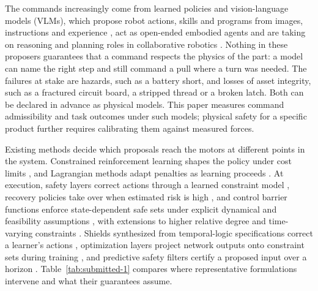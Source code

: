\documentclass[12pt]{article}
\begin{document}
The commands increasingly come from learned policies and vision-language
models (VLMs), which propose robot actions, skills and programs from images,
instructions and experience \cite{ref8,ref9,ref10,ref11,ref13}, act as open-ended
embodied agents \cite{ref12} and are taking on
reasoning and planning roles in collaborative robotics \cite{ref39}. Nothing
in these proposers guarantees that a command respects the physics of the part:
a model can name the right step and still command a pull where a turn was
needed. The failures at stake are hazards, such as a battery short, and losses
of asset integrity, such as a fractured circuit board, a stripped thread or a
broken latch. Both can be declared in advance as physical models. This paper
measures command admissibility and task outcomes under such models; physical
safety for a specific product further requires calibrating them against
measured forces.

Existing methods decide which proposals reach the motors at different points
in the system.
Constrained reinforcement learning shapes the policy under cost limits
\cite{ref16,ref17}, and Lagrangian methods adapt penalties as learning
proceeds \cite{ref18,ref19,ref20}. At execution, safety layers correct actions
through a learned constraint model \cite{ref21}, recovery policies take over
when estimated risk is high \cite{ref22}, and control barrier functions enforce
state-dependent safe sets under explicit dynamical and feasibility assumptions
\cite{ref23,ref24}, with extensions to higher relative degree \cite{ref40} and
time-varying constraints \cite{ref41}. Shields synthesized from temporal-logic
specifications correct a learner's actions \cite{ref42}, optimization layers
project network outputs onto constraint sets during training \cite{ref43}, and
predictive safety filters certify a proposed input over a horizon
\cite{ref44}. Table~\ref{tab:submitted-1} compares where representative
formulations intervene and what their guarantees assume.
\end{document}
